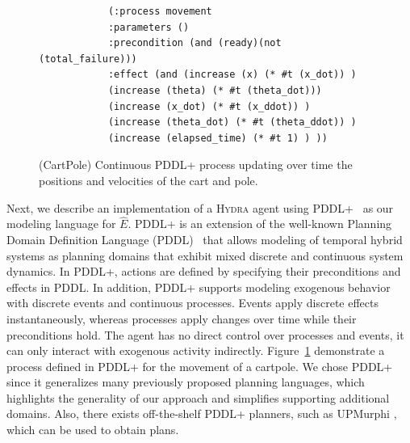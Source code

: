 \documentclass[letterpaper]{article} %
\newcommand{\sbirds}{Science Birds\xspace} %
\newcommand{\hydra}{\textsc{Hydra}\xspace} %
\begin{document}
\begin{figure}
	\begin{center}
		\fontsize{8pt}{10pt}\selectfont
		\begin{verbatim}
			(:process movement
			:parameters ()
			:precondition (and (ready)(not (total_failure)))
			:effect (and (increase (x) (* #t (x_dot)) )
			(increase (theta) (* #t (theta_dot)))
			(increase (x_dot) (* #t (x_ddot)) )
			(increase (theta_dot) (* #t (theta_ddot)) )
			(increase (elapsed_time) (* #t 1) ) ))
		\end{verbatim}
		\caption{(CartPole) Continuous PDDL+ process updating over time the positions and velocities of the cart and pole.}
		\label{fig:process-cartpole}
	\end{center}
\end{figure}


Next, we describe an implementation of a \hydra agent using PDDL+~\cite{fox2006modelling} as our modeling language for $\hat{E}$. 
PDDL+ is an extension of the well-known Planning Domain Definition Language (PDDL)~\cite{mcdermott1998pddl} that allows modeling of temporal hybrid systems as planning domains that exhibit mixed discrete and continuous system dynamics.
In PDDL+, actions are defined by specifying their preconditions and effects in PDDL. 
In addition, PDDL+ supports modeling exogenous behavior with discrete events and continuous processes.
Events apply discrete effects instantaneously, whereas processes apply changes over time while their preconditions hold. The agent has no direct control over processes and events, it can only interact with exogenous activity indirectly. 
Figure~\ref{fig:process-cartpole} demonstrate a process defined in PDDL+ for the movement of a cartpole. 
We chose PDDL+ since it generalizes many previously proposed planning languages, which highlights the generality of our approach and simplifies supporting additional domains. 
Also, there exists off-the-shelf PDDL+ planners, such as UPMurphi \cite{della2009upmurphi}, which can be used to obtain plans. 

 

\end{document}
